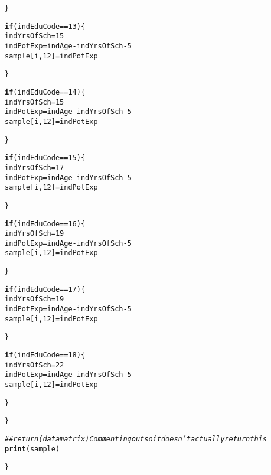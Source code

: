 \documentclass{article}\usepackage[]{graphicx}\usepackage[]{color}
\makeatletter
\newcommand{\hlnum}[1]{\textcolor[rgb]{0.686,0.059,0.569}{#1}}%
\newcommand{\hlcom}[1]{\textcolor[rgb]{0.678,0.584,0.686}{\textit{#1}}}%
\newcommand{\hlopt}[1]{\textcolor[rgb]{0,0,0}{#1}}%
\newcommand{\hlstd}[1]{\textcolor[rgb]{0.345,0.345,0.345}{#1}}%
\newcommand{\hlkwa}[1]{\textcolor[rgb]{0.161,0.373,0.58}{\textbf{#1}}}%
\newcommand{\hlkwb}[1]{\textcolor[rgb]{0.69,0.353,0.396}{#1}}%
\newcommand{\hlkwd}[1]{\textcolor[rgb]{0.737,0.353,0.396}{\textbf{#1}}}%
\newenvironment{kframe}{%
 \def\at@end@of@kframe{}%
 \ifinner\ifhmode%
  \def\at@end@of@kframe{\end{minipage}}%
  \begin{minipage}{\columnwidth}%
 \fi\fi%
 \def\FrameCommand##1{\hskip\@totalleftmargin \hskip-\fboxsep
 \colorbox{shadecolor}{##1}\hskip-\fboxsep
     \hskip-\linewidth \hskip-\@totalleftmargin \hskip\columnwidth}%
 \MakeFramed {\advance\hsize-\width
   \@totalleftmargin\z@ \linewidth\hsize
   \@setminipage}}%
 {\par\unskip\endMakeFramed%
 \at@end@of@kframe}
\newenvironment{knitrout}{}{} %
\makeatother
\begin{document}
\begin{knitrout}
\begin{kframe}
\begin{alltt}
    \hlstd{\}}

    \hlkwa{if} \hlstd{(indEduCode} \hlopt{==} \hlnum{13}\hlstd{)\{}
      \hlstd{indYrsOfSch} \hlkwb{=} \hlnum{15}
      \hlstd{indPotExp} \hlkwb{=} \hlstd{indAge} \hlopt{-} \hlstd{indYrsOfSch} \hlopt{-} \hlnum{5}
      \hlstd{sample[i,}\hlnum{12}\hlstd{]} \hlkwb{=} \hlstd{indPotExp}

    \hlstd{\}}

    \hlkwa{if} \hlstd{(indEduCode} \hlopt{==} \hlnum{14}\hlstd{)\{}
      \hlstd{indYrsOfSch} \hlkwb{=} \hlnum{15}
      \hlstd{indPotExp} \hlkwb{=} \hlstd{indAge} \hlopt{-} \hlstd{indYrsOfSch} \hlopt{-} \hlnum{5}
      \hlstd{sample[i,}\hlnum{12}\hlstd{]} \hlkwb{=} \hlstd{indPotExp}

    \hlstd{\}}

    \hlkwa{if} \hlstd{(indEduCode} \hlopt{==} \hlnum{15}\hlstd{)\{}
      \hlstd{indYrsOfSch} \hlkwb{=} \hlnum{17}
      \hlstd{indPotExp} \hlkwb{=} \hlstd{indAge} \hlopt{-} \hlstd{indYrsOfSch} \hlopt{-} \hlnum{5}
      \hlstd{sample[i,}\hlnum{12}\hlstd{]} \hlkwb{=} \hlstd{indPotExp}

    \hlstd{\}}

    \hlkwa{if} \hlstd{(indEduCode} \hlopt{==} \hlnum{16}\hlstd{)\{}
      \hlstd{indYrsOfSch} \hlkwb{=} \hlnum{19}
      \hlstd{indPotExp} \hlkwb{=} \hlstd{indAge} \hlopt{-} \hlstd{indYrsOfSch} \hlopt{-} \hlnum{5}
      \hlstd{sample[i,}\hlnum{12}\hlstd{]} \hlkwb{=} \hlstd{indPotExp}

    \hlstd{\}}

    \hlkwa{if} \hlstd{(indEduCode} \hlopt{==} \hlnum{17}\hlstd{)\{}
      \hlstd{indYrsOfSch} \hlkwb{=} \hlnum{19}
      \hlstd{indPotExp} \hlkwb{=} \hlstd{indAge} \hlopt{-} \hlstd{indYrsOfSch} \hlopt{-} \hlnum{5}
      \hlstd{sample[i,}\hlnum{12}\hlstd{]} \hlkwb{=} \hlstd{indPotExp}

    \hlstd{\}}

    \hlkwa{if} \hlstd{(indEduCode} \hlopt{==} \hlnum{18}\hlstd{)\{}
      \hlstd{indYrsOfSch} \hlkwb{=} \hlnum{22}
      \hlstd{indPotExp} \hlkwb{=} \hlstd{indAge} \hlopt{-} \hlstd{indYrsOfSch} \hlopt{-} \hlnum{5}
      \hlstd{sample[i,}\hlnum{12}\hlstd{]} \hlkwb{=} \hlstd{indPotExp}

    \hlstd{\}}

  \hlstd{\}}

  \hlcom{## return(datamatrix) Commenting out so it doesn't actually return this}
  \hlkwd{print}\hlstd{(sample)}

\hlstd{\}}


\end{alltt}
\end{kframe}
\end{knitrout}
\end{document}
